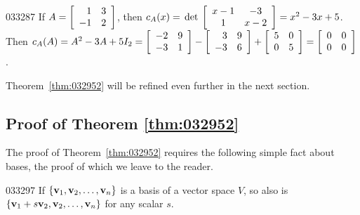 \begin{example}{}{033287}
If $A = \left[ \begin{array}{rr}
1 & 3 \\
-1 & 2
\end{array} \right]$, then $c_A(x) = \thinspace\operatorname{det\medspace}\left[ \begin{array}{cc}
x - 1 & -3 \\
1 & x - 2
\end{array} \right] = x^2 - 3x + 5$. Then $c_A(A) = A^2 - 3A + 5I_2 = \left[ \begin{array}{rr}
-2 & 9 \\
-3 & 1
\end{array} \right] - \left[ \begin{array}{rr}
3 & 9 \\
-3 & 6
\end{array} \right] + \left[ \begin{array}{rr}
5 & 0 \\
0 & 5
\end{array} \right] = \left[ \begin{array}{rr}
0 & 0 \\
0 & 0
\end{array} \right]$.
\end{example}

Theorem~\ref{thm:032952} will be refined even further in the next section.

\subsection*{Proof of Theorem \ref{thm:032952}}

The proof of Theorem~\ref{thm:032952} requires the following simple fact about bases, the proof of which we leave to the reader.

\begin{lemma}{}{033297}
If $\{\textbf{v}_1, \textbf{v}_2, \dots, \textbf{v}_n\}$ is a basis of a vector space $V$, so also is $\{\textbf{v}_1 + s\textbf{v}_2, \textbf{v}_2, \dots, \textbf{v}_n\}$ for any scalar $s$.
\end{lemma}

